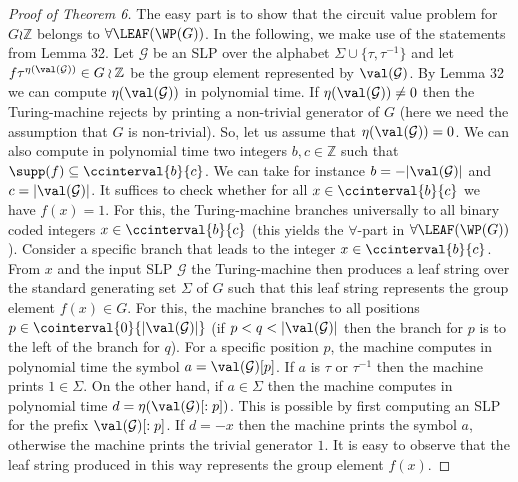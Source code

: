 \begin{proof}[Proof of Theorem 6]
The easy part is to show that the circuit value problem for $G \wr \mathbb{Z}$ belongs to
$\forall\LEAF(\WP(G))$. In the following, we make use
of the statements from Lemma 32.
Let $\mathcal{G}$ be an SLP over the alphabet $\Sigma \cup \{\tau,\tau^{-1}\}$ and let $f \tau^{\eta(\val(\mathcal{G}))} \in G \wr \mathbb{Z}$
be the group element represented by $\val(\mathcal{G})$. By Lemma 32 we can compute $\eta(\val(\mathcal{G}))$ in polynomial time. 
If $\eta(\val(\mathcal{G})) \neq 0$ then the Turing-machine rejects by printing a non-trivial generator of $G$ (here we need the assumption that
$G$ is non-trivial).
So, let us assume that $\eta(\val(\mathcal{G}))=0$. 
We can also compute in polynomial time two integers $b,c \in \mathbb{Z}$ such that $\supp(f) \subseteq \ccinterval{b}{c}$. We can
take for instance $b = -|\val(\mathcal{G})|$ and $c = |\val(\mathcal{G})|$. It suffices to check whether for all
$ x \in \ccinterval{b}{c}$ we have $ f(x)=1$. For this, the Turing-machine branches universally to all binary coded integers $x \in \ccinterval{b}{c}$
(this yields the $\forall$-part in $\forall \LEAF(\WP(G))$). Consider a specific branch that leads to the integer 
$x \in \ccinterval{b}{c}$. From $x$ and the input SLP $\mathcal{G}$ the Turing-machine then produces a leaf string over the standard
generating set $\Sigma$ of $G$ such that this leaf string represents the group element $f(x) \in G$. For this, the machine
branches to all positions $p \in \cointerval{0}{|\val(\mathcal{G})|}$ (if $p<q<|\val(\mathcal{G})|$ then the branch for $p$ is to the left 
of the branch for $q$). For a specific position $p$, the machine computes in polynomial time the symbol
$a = \val(\mathcal{G})[p]$. If $a$ is $\tau$ or $\tau^{-1}$ then the machine prints $1 \in \Sigma$. On the other hand, if 
$a \in \Sigma$ then the machine computes in polynomial time $d = \eta(\val(\mathcal{G})[:p])$. This is possible by first
computing an SLP for the prefix $\val(\mathcal{G})[:p]$. If $d=-x$ then the machine prints the symbol $a$, otherwise
the machine prints the trivial generator $1$. It is easy to observe that the leaf string produced in this way represents the 
group element $f(x)$.


\end{proof}
